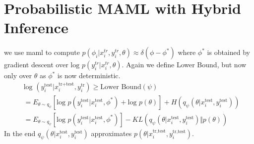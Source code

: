 \documentclass{article}
\begin{document}
	\section{Probabilistic MAML with Hybrid Inference}
	we use maml to compute $p(\phi_i \vert x_i^{tr}, y_i^{tr}, \theta) \approx \delta(\phi - \phi^*)$ where $\phi^*$ is obtained by gradient descent over $\text{log } p(y_i^{tr} \vert x_i^{tr}, \theta)$. Again we define Lower Bound, but now only over $\theta$ as $\phi^*$ is now deterministic. 
	\begin{align}
		&\text{log }(y_i^{\text{test}} \vert x_i^{\text{tr+test}}, y_i^{\text{tr}}) \ge \text{Lower Bound}(\psi)\\
		&= E_{\theta \sim q_{\psi}}[\text{log } p(y_i^{\text{test}} \vert x_i^{\text{test}}, \phi^*) + \text{log } p(\theta)] + H(q_{\psi}(\theta \vert x_i^{\text{test}}, y_i^{\text{test}})) \\
		&= E_{\theta \sim q_{\psi}}[\text{log } p(y_i^{\text{test}} \vert x_i^{\text{test}}, \phi^*)] - KL(q_{\psi}(\theta \vert x_i^{\text{test}}, y_i^{\text{test}}) \Vert p(\theta))
	\end{align}
	In the end $q_{\psi}(\theta \vert x_i^{\text{test}}, y_i^{\text{test}})$ approximates $p(\theta \vert x_i^{\text{tr,test}}, y_i^{\text{tr,test}})$.
\end{document}
